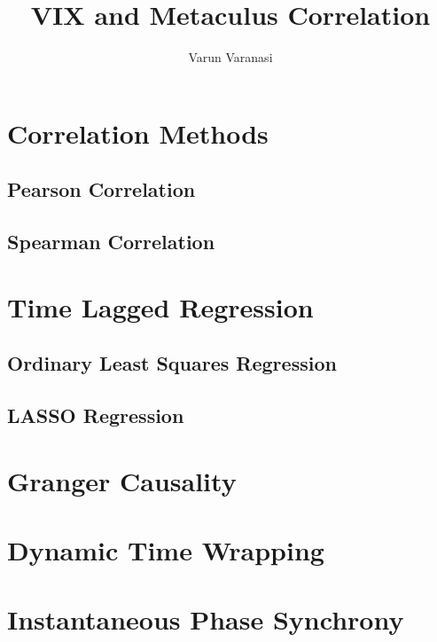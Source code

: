 \documentclass{article}
\title{VIX and Metaculus Correlation}
\author{Varun Varanasi}
\begin{document}
\maketitle

\section*{Correlation Methods}
\subsection*{Pearson Correlation}
\subsection*{Spearman Correlation}

\section*{Time Lagged Regression}
\subsection*{Ordinary Least Squares Regression}
\subsection*{LASSO Regression}

\section*{Granger Causality}
\section*{Dynamic Time Wrapping}
\section*{Instantaneous Phase Synchrony}
\end{document}
